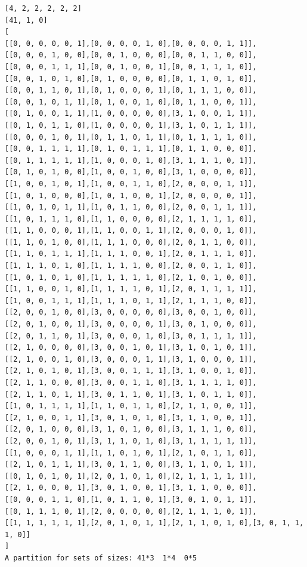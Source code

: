 \documentclass[final]{dmtcs-episciences}
\begin{document}
\begin{appendices}
\begin{verbatim} 
[4, 2, 2, 2, 2, 2]
[41, 1, 0]
[
[[0, 0, 0, 0, 0, 1],[0, 0, 0, 0, 1, 0],[0, 0, 0, 0, 1, 1]],
[[0, 0, 0, 1, 0, 0],[0, 0, 1, 0, 0, 0],[0, 0, 1, 1, 0, 0]],
[[0, 0, 0, 1, 1, 1],[0, 0, 1, 0, 0, 1],[0, 0, 1, 1, 1, 0]],
[[0, 0, 1, 0, 1, 0],[0, 1, 0, 0, 0, 0],[0, 1, 1, 0, 1, 0]],
[[0, 0, 1, 1, 0, 1],[0, 1, 0, 0, 0, 1],[0, 1, 1, 1, 0, 0]],
[[0, 0, 1, 0, 1, 1],[0, 1, 0, 0, 1, 0],[0, 1, 1, 0, 0, 1]],
[[0, 1, 0, 0, 1, 1],[1, 0, 0, 0, 0, 0],[3, 1, 0, 0, 1, 1]],
[[0, 1, 0, 1, 1, 0],[1, 0, 0, 0, 0, 1],[3, 1, 0, 1, 1, 1]],
[[0, 0, 0, 1, 0, 1],[0, 1, 1, 0, 1, 1],[0, 1, 1, 1, 1, 0]],
[[0, 0, 1, 1, 1, 1],[0, 1, 0, 1, 1, 1],[0, 1, 1, 0, 0, 0]],
[[0, 1, 1, 1, 1, 1],[1, 0, 0, 0, 1, 0],[3, 1, 1, 1, 0, 1]],
[[0, 1, 0, 1, 0, 0],[1, 0, 0, 1, 0, 0],[3, 1, 0, 0, 0, 0]],
[[1, 0, 0, 1, 0, 1],[1, 0, 0, 1, 1, 0],[2, 0, 0, 0, 1, 1]],
[[1, 0, 1, 0, 0, 0],[1, 0, 1, 0, 0, 1],[2, 0, 0, 0, 0, 1]],
[[1, 0, 1, 0, 1, 1],[1, 0, 1, 1, 0, 0],[2, 0, 0, 1, 1, 1]],
[[1, 0, 1, 1, 1, 0],[1, 1, 0, 0, 0, 0],[2, 1, 1, 1, 1, 0]],
[[1, 1, 0, 0, 0, 1],[1, 1, 0, 0, 1, 1],[2, 0, 0, 0, 1, 0]],
[[1, 1, 0, 1, 0, 0],[1, 1, 1, 0, 0, 0],[2, 0, 1, 1, 0, 0]],
[[1, 1, 0, 1, 1, 1],[1, 1, 1, 0, 0, 1],[2, 0, 1, 1, 1, 0]],
[[1, 1, 1, 0, 1, 0],[1, 1, 1, 1, 0, 0],[2, 0, 0, 1, 1, 0]],
[[1, 0, 1, 0, 1, 0],[1, 1, 1, 1, 1, 0],[2, 1, 0, 1, 0, 0]],
[[1, 1, 0, 0, 1, 0],[1, 1, 1, 1, 0, 1],[2, 0, 1, 1, 1, 1]],
[[1, 0, 0, 1, 1, 1],[1, 1, 1, 0, 1, 1],[2, 1, 1, 1, 0, 0]],
[[2, 0, 0, 1, 0, 0],[3, 0, 0, 0, 0, 0],[3, 0, 0, 1, 0, 0]],
[[2, 0, 1, 0, 0, 1],[3, 0, 0, 0, 0, 1],[3, 0, 1, 0, 0, 0]],
[[2, 0, 1, 1, 0, 1],[3, 0, 0, 0, 1, 0],[3, 0, 1, 1, 1, 1]],
[[2, 1, 0, 0, 0, 0],[3, 0, 0, 1, 0, 1],[3, 1, 0, 1, 0, 1]],
[[2, 1, 0, 0, 1, 0],[3, 0, 0, 0, 1, 1],[3, 1, 0, 0, 0, 1]],
[[2, 1, 0, 1, 0, 1],[3, 0, 0, 1, 1, 1],[3, 1, 0, 0, 1, 0]],
[[2, 1, 1, 0, 0, 0],[3, 0, 0, 1, 1, 0],[3, 1, 1, 1, 1, 0]],
[[2, 1, 1, 0, 1, 1],[3, 0, 1, 1, 0, 1],[3, 1, 0, 1, 1, 0]],
[[1, 0, 1, 1, 1, 1],[1, 1, 0, 1, 1, 0],[2, 1, 1, 0, 0, 1]],
[[2, 1, 0, 0, 1, 1],[3, 0, 1, 0, 1, 0],[3, 1, 1, 0, 0, 1]],
[[2, 0, 1, 0, 0, 0],[3, 1, 0, 1, 0, 0],[3, 1, 1, 1, 0, 0]],
[[2, 0, 0, 1, 0, 1],[3, 1, 1, 0, 1, 0],[3, 1, 1, 1, 1, 1]],
[[1, 0, 0, 0, 1, 1],[1, 1, 0, 1, 0, 1],[2, 1, 0, 1, 1, 0]],
[[2, 1, 0, 1, 1, 1],[3, 0, 1, 1, 0, 0],[3, 1, 1, 0, 1, 1]],
[[0, 1, 0, 1, 0, 1],[2, 0, 1, 0, 1, 0],[2, 1, 1, 1, 1, 1]],
[[2, 1, 0, 0, 0, 1],[3, 0, 1, 0, 0, 1],[3, 1, 1, 0, 0, 0]],
[[0, 0, 0, 1, 1, 0],[1, 0, 1, 1, 0, 1],[3, 0, 1, 0, 1, 1]],
[[0, 1, 1, 1, 0, 1],[2, 0, 0, 0, 0, 0],[2, 1, 1, 1, 0, 1]],
[[1, 1, 1, 1, 1, 1],[2, 0, 1, 0, 1, 1],[2, 1, 1, 0, 1, 0],[3, 0, 1, 1, 1, 0]]
]
A partition for sets of sizes: 41*3  1*4  0*5
\end{verbatim}


\end{appendices}
\end{document}
